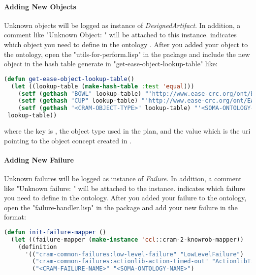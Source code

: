 \paragraph{Adding New Objects}
Unknown objects will be logged as instance of \textit{DesignedArtifact}.
In addition, a comment like "Unknown Object: " will be attached to this instance.
 indicates which object you need to define in the ontology .
After you added your object to the ontology, open the "utils-for-perform.lisp" in the \cramloggerpackage package and include the new object in the hash table generate in "get-ease-object-lookup-table" like:

\begin{lstlisting}[language=lisp, caption=Linking the CRAM Object to the Ontology Concept]
(defun get-ease-object-lookup-table()
  (let ((lookup-table (make-hash-table :test 'equal)))
    (setf (gethash "BOWL" lookup-table) "'http://www.ease-crc.org/ont/EASE-OBJ.owl#Bowl'")
    (setf (gethash "CUP" lookup-table) "'http://www.ease-crc.org/ont/EASE-OBJ.owl#Cup'")
    (setf (gethash "<CRAM-OBJECT-TYPE>" lookup-table) "'<SOMA-ONTOLOGY-ENTITY-URL>'")
 lookup-table))
\end{lstlisting}

where the key is , the object type used in the \cram plan, and the value which is the uri pointing to the object concept created in \soma.

\paragraph{Adding New Failure}
Unknown \cram failures will be logged as instance of \textit{Failure}.
In addition, a comment like "Unknown failure: " will be attached to the instance.
 indicates which failure you need to define in the ontology.
After you added your failure to the ontology, open the "failure-handler.lisp" in the \cramloggerpackage package and add your new failure in the format:

\begin{lstlisting}[language=lisp, caption=Linking the CRAM Action to the Ontology Concept]
(defun init-failure-mapper ()
  (let ((failure-mapper (make-instance 'ccl::cram-2-knowrob-mapper))
    (definition
      '(("cram-common-failures:low-level-failure" "LowLevelFailure")
        ("cram-common-failures:actionlib-action-timed-out" "ActionlibTimeout")
        ("<CRAM-FAILURE-NAME>" "<SOMA-ONTOLOGY-NAME>")
\end{lstlisting}


